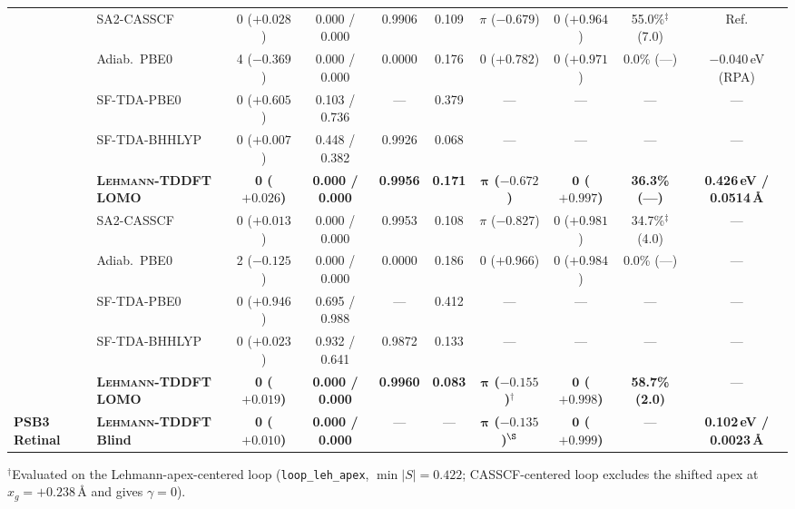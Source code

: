 \documentclass[10pt,twocolumn]{article}
\theoremstyle{natthm}
\newcommand{\leh}{\textsc{Lehmann-TDDFT}}
\begin{document}
\begin{table}[t!]
{\begin{tabular}{@{}llcccccccc@{}}
 & SA2-CASSCF & 0 ($+0.028$) & 0.000 / 0.000 & 0.9906 & 0.109 & $\pi$ ($-0.679$) & $0$ ($+0.964$) & 55.0\%$^\ddagger$ (7.0) & Ref. \\
 & Adiab.\ PBE0 & 4 ($-0.369$) & 0.000 / 0.000 & 0.0000 & 0.176 & $0$ ($+0.782$) & $0$ ($+0.971$) & 0.0\% (---) & $-0.040$\,eV (RPA) \\
 & SF-TDA-PBE0 & 0 ($+0.605$) & 0.103 / 0.736 & --- & 0.379 & --- & --- & --- & --- \\
 & SF-TDA-BHHLYP & 0 ($+0.007$) & 0.448 / 0.382 & 0.9926 & 0.068 & --- & --- & --- & --- \\
 & \textbf{\leh{} LOMO} & \textbf{0 ($+0.026$)} & \textbf{0.000 / 0.000} & \textbf{0.9956} & \textbf{0.171} & \textbf{$\boldsymbol{\pi}$ ($-0.672$)} & \textbf{$\mathbf{0}$ ($+0.997$)} & \textbf{36.3\% (---)} & \textbf{0.426\,eV / 0.0514\,\AA} \\
\midrule
{}
 & SA2-CASSCF & 0 ($+0.013$) & 0.000 / 0.000 & 0.9953 & 0.108 & $\pi$ ($-0.827$) & $0$ ($+0.981$) & 34.7\%$^\ddagger$ (4.0) & --- \\
 & Adiab.\ PBE0 & 2 ($-0.125$) & 0.000 / 0.000 & 0.0000 & 0.186 & $0$ ($+0.966$) & $0$ ($+0.984$) & 0.0\% (---) & --- \\
 & SF-TDA-PBE0 & 0 ($+0.946$) & 0.695 / 0.988 & --- & 0.412 & --- & --- & --- & --- \\
 & SF-TDA-BHHLYP & 0 ($+0.023$) & 0.932 / 0.641 & 0.9872 & 0.133 & --- & --- & --- & --- \\
 & \textbf{\leh{} LOMO} & \textbf{0 ($+0.019$)} & \textbf{0.000 / 0.000} & \textbf{0.9960} & \textbf{0.083} & \textbf{$\boldsymbol{\pi}$ ($-0.155$)$^\dagger$} & \textbf{$\mathbf{0}$ ($+0.998$)} & \textbf{58.7\% (2.0)} & --- \\
\midrule
\textbf{PSB3 Retinal} & \textbf{\leh{} Blind} & \textbf{0 ($+0.010$)} & \textbf{0.000 / 0.000} & --- & --- & \textbf{$\boldsymbol{\pi}$ ($-0.135$)$^\S$} & \textbf{$\mathbf{0}$ ($+0.999$)} & --- & \textbf{0.102\,eV / 0.0023\,\AA} \\
\bottomrule
\end{tabular}}
\par\vspace{2pt}
{\raggedright\sffamily\fontsize{6.5}{7.8}\selectfont
$^\dagger$Evaluated on the Lehmann-apex-centered loop (\texttt{loop\_leh\_apex}, $\min|S|=0.422$; CASSCF-centered loop excludes the shifted apex at $x_g=+0.238$\,\AA{} and gives $\gamma=0$).
}
\end{table}
\end{document}
